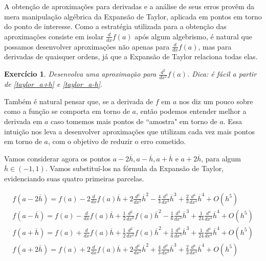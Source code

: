 \documentclass[]{article}
\newtheorem{exercicio}{Exercício}
\numberwithin{equation}{section}
\begin{document}
A obtenção de aproximações para derivadas e a análise de seus erros provêm da mera manipulação algébrica da Expansão de Taylor, aplicada em pontos em torno do ponto de interesse. Como a estratégia utilizada para a obtenção das aproximações consiste em isolar $\frac{d}{dx} f(a)$ após algum algebrismo, é natural que possamos desenvolver aproximações não apenas para $\frac{d}{dx} f(a)$, mas para derivadas de quaisquer ordens, já que a Expansão de Taylor relaciona todas elas.

\begin{exercicio}
	Desenvolva uma aproximação para $\frac{d^2}{dx^2} f(a)$. Dica: é fácil a partir de \eqref{taylor_a+h} e \eqref{taylor_a-h}.
\end{exercicio}

Também é natural pensar que, se a derivada de $f$ em $a$ nos diz um pouco sobre como a função se comporta em torno de $a$, então podemos entender melhor a derivada em $a$ caso tomemos mais pontos de ``amostra" em torno de $a$. Essa intuição nos leva a desenvolver aproximações que utilizam cada vez mais pontos em torno de $a$, com o objetivo de reduzir o erro cometido.

Vamos considerar agora os pontos $a - 2\overline{h}, a - \overline{h}, a + \overline{h}$ e $a + 2\overline{h}$, para algum $\overline{h} \in (-1, 1)$. Vamos substituí-los na fórmula da Expansão de Taylor, evidenciando suas quatro primeiras parcelas.

\begin{align}
f(a - 2\overline{h}) = f(a) - 2\frac{d}{dx} f(a) \overline{h} + 2\frac{d^2}{dx^2} \overline{h}^2 - \frac{4}{3} \frac{d^3}{dx^3} \overline{h}^3 + \frac{2}{3} \frac{d^4}{dx^4} \overline{h}^4 + O(h^5) \label{taylor_a-2h} \\
f(a - \overline{h}) = f(a) - \frac{d}{dx} f(a)\overline{h} + \frac{1}{2} \frac{d^2}{dx^2} f(a) \overline{h}^2 - \frac{1}{6} \frac{d^3}{dx^3} \overline{h}^3 + \frac{1}{24} \frac{d^4}{dx^4} \overline{h}^4 + O(h^5) \label{taylor_a-h_4parcelas} \\
f(a + \overline{h}) = f(a) + \frac{d}{dx} f(a)\overline{h} + \frac{1}{2} \frac{d^2}{dx^2} f(a) \overline{h}^2 + \frac{1}{6} \frac{d^3}{dx^3} \overline{h}^3 + \frac{1}{24} \frac{d^4}{dx^4} \overline{h}^4 + O(h^5) \label{taylor_a+h_4parcelas} \\
f(a + 2\overline{h}) = f(a) + 2\frac{d}{dx} f(a) \overline{h} + 2\frac{d^2}{dx^2} \overline{h}^2 + \frac{4}{3} \frac{d^3}{dx^3} \overline{h}^3 + \frac{2}{3} \frac{d^4}{dx^4} \overline{h}^4 + O(h^5) \label{taylor_a+2h}
\end{align}
\end{document}
